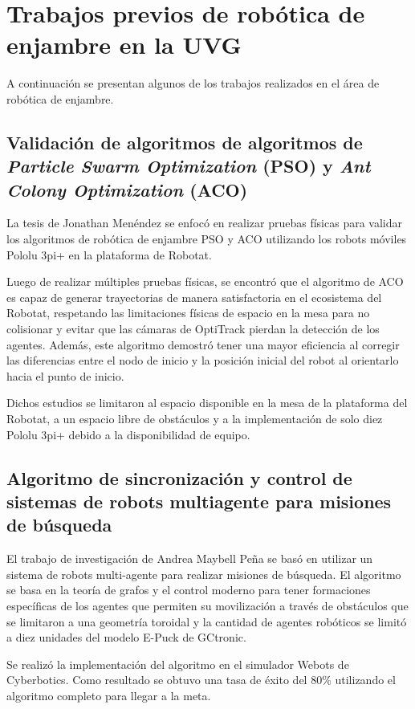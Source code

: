 \section{Trabajos previos de robótica de enjambre en la UVG}
A continuación se presentan algunos de los trabajos realizados en el área de robótica de enjambre.

\subsection{Validación de algoritmos de algoritmos de \textit{Particle Swarm Optimization} (PSO) y \textit{Ant Colony Optimization} (ACO)}
La tesis de Jonathan Menéndez \cite{MenendezJ_2023_tesis} se enfocó en realizar pruebas físicas para validar los algoritmos de robótica de enjambre PSO y ACO utilizando los robots móviles Pololu 3pi+ en la plataforma de Robotat. 

Luego de realizar múltiples pruebas físicas, se encontró que el algoritmo de ACO es capaz de generar trayectorias de manera satisfactoria en el ecosistema del Robotat, respetando las limitaciones físicas de espacio en la mesa para no colisionar y evitar que las cámaras de OptiTrack pierdan la detección de los agentes. Además, este algoritmo demostró tener una mayor eficiencia al corregir las diferencias entre el nodo de inicio y la posición inicial del robot al orientarlo hacia el punto de inicio. 

Dichos estudios se limitaron al espacio disponible en la mesa de la plataforma del Robotat, a un espacio libre de obstáculos y a la implementación de solo diez Pololu 3pi+ debido a la disponibilidad de equipo. 

\subsection{Algoritmo de sincronización y control de sistemas de robots multiagente para misiones de búsqueda}
El trabajo de investigación de Andrea Maybell Peña \cite{PenaAM_2019_tesis} se basó en utilizar un sistema de robots multi-agente para realizar misiones de búsqueda. El algoritmo se basa en la teoría de grafos y el control moderno para tener formaciones específicas de los agentes que permiten su movilización a través de obstáculos que se limitaron a una geometría toroidal y la cantidad de agentes robóticos se limitó a diez unidades del modelo E-Puck de GCtronic.

Se realizó la implementación del algoritmo en el simulador Webots de Cyberbotics. Como resultado se obtuvo una tasa de éxito del 80\% utilizando el algoritmo completo para llegar a la meta.


